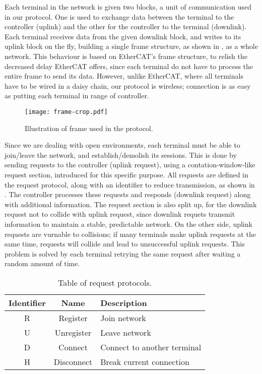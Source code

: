 ﻿\documentclass[twocolumn,9pt]{ltjsarticle}
\renewcommand{\ref}{\Cref}
\begin{document}
Each terminal in the network is given two blocks, a unit of communication used in our protocol.
One is used to exchange data between the terminal to the controller (uplink) and the other for the controller to the terminal (downlink).
Each terminal receives data from the given downlink block, and writes to its uplink block on the fly, building a single frame structure, as shown in \ref{fig:frame}, as a whole network.
This behaviour is based on EtherCAT's frame structure, to relish the decreased delay EtherCAT offers, since each terminal do not have to process the entire frame to send its data.
However, unlike EtherCAT, where all terminals have to be wired in a daisy chain, our protocol is wireless; connection is as easy as putting each terminal in range of controller.
\begin{figure}[tb]
  \centering
  \texttt{[image: frame-crop.pdf]}
  \caption{\label{fig:frame}
    Illustration of frame used in the protocol.
  }
\end{figure}
Since we are dealing with open environments, each terminal must be able to join/leave the network, and establish/demolish its sessions.
This is done by sending requests to the controller (uplink request), using a contation-window-like request section, introduced for this specific purpose.
All requests are defined in the request protocol, along with an identifier to reduce transmission, as shown in \ref{tab:request}.
The controller processes these requests and responds (downlink request) along with additional information.
The request section is also split up, for the downlink request not to collide with uplink request, since downlink requets transmit information to maintain a stable, predictable network.
On the other side, uplink requests are vurnable to collisions; if many terminals make uplink requests at the same time, requests will collide and lead to unsuccessful uplink requests.
This problem is solved by each terminal retrying the same request after waiting a random amount of time.
\begin{table}[tb]
  \centering
  \caption{\label{tab:request}
    Table of request protocols.
  }
  \begin{tabularx}{\linewidth}{ccl}
    \hline
    Identifier & Name & Description\\
    \hline \hline
    R & Register & Join network\\
    U & Unregister & Leave network\\
    D & Connect & Connect to another terminal\\
    H & Disconnect & Break current connection\\
    \hline
  \end{tabularx}
\end{table}
\end{document}
